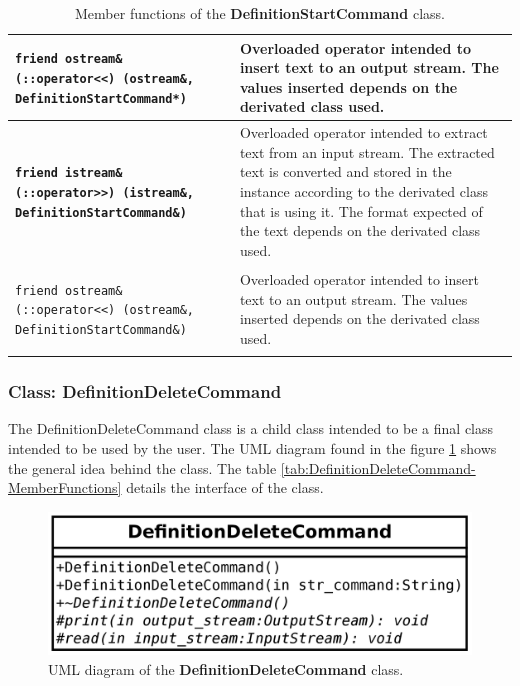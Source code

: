\documentclass[11pt,twoside,openany,x11names,svgnames]{memoir}
\begin{document}
\begin{table}[h]
\begin{tabular}{| >{\bfseries}p{7.5cm} | p{8cm} |}
	\hline
	
	\texttt{friend ostream\& (::operator<<) (ostream\&, DefinitionStartCommand*)} & Overloaded operator intended to insert text to an output stream. The values inserted depends on the derivated class used. \\
	
	\hline
	
	\texttt{friend istream\& (::operator>>) (istream\&, DefinitionStartCommand\&)} & Overloaded operator intended to extract text from an input stream. The extracted text is converted and stored in the instance according to the derivated class that is using it. The format expected of the text depends on the derivated class used. \\
	
	\hline
	
	\texttt{friend ostream\& (::operator<<) (ostream\&, DefinitionStartCommand\&)} & Overloaded operator intended to insert text to an output stream. The values inserted depends on the derivated class used. \\
	
	\hline
\end{tabular}
\caption{Member functions of the \textbf{DefinitionStartCommand} class.}
\label{tab:DefinitionStartCommand-MemberFunctions}
\end{table}

\clearpage

\subsubsection{Class: DefinitionDeleteCommand}\label{Class-DefinitionDeleteCommand}

The DefinitionDeleteCommand class is a child class intended to be a final class intended to be used by the user. The UML diagram found in the figure \ref{fig:class-definitiondelete-command} shows the general idea behind the class. The table \ref{tab:DefinitionDeleteCommand-MemberFunctions} details the interface of the class.

\begin{figure}
	\centering
	\includegraphics[scale=0.2, clip=true, trim= 0pt 0pt 0pt 0pt]{images/chapter03-image26}
	\caption{UML diagram of the \textbf{DefinitionDeleteCommand} class.}
	\label{fig:class-definitiondelete-command}
\end{figure}
\end{document}
